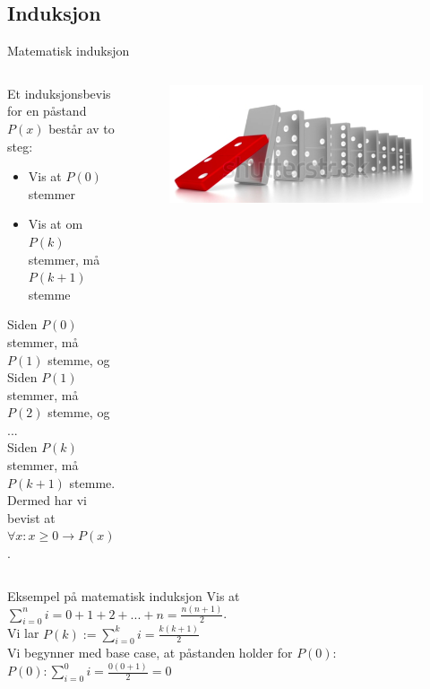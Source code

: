 \subsection{Induksjon}
\begin{frame}{Matematisk induksjon}
    \begin{columns}
        \begin{column}{0.65\textwidth}
            Et induksjonsbevis for en påstand $P(x)$ består av to steg:
            \begin{itemize}
                \item Vis at $P(0)$ stemmer
                \item Vis at om $P(k)$ stemmer, må $P(k+1)$ stemme
            \end{itemize}
        
            \pause
            Siden $P(0)$ stemmer, må $P(1)$ stemme, og\\
            Siden $P(1)$ stemmer, må $P(2)$ stemme, og\\
            ...\\
            Siden $P(k)$ stemmer, må $P(k+1)$ stemme.\\[1.5mm]
        
            \pause
            Dermed har vi bevist at $\forall x : x \geq 0 \rightarrow P(x)$.
        \end{column}
        \pause
        \begin{column}{0.2\textwidth}
            \begin{figure}
                \includegraphics[scale=0.1]{images/domino.PNG}
            \end{figure}
        \end{column}
    \end{columns}
\end{frame}

\begin{frame}{Eksempel på matematisk induksjon}
    Vis at $\sum_{i=0}^{n} i = 0 + 1 + 2 + ... + n = \frac{n(n+1)}{2}$.\\[4mm]
\pause    
    Vi lar $P(k) := \sum_{i=0}^{k} i = \frac{k(k+1)}{2}$\\[2mm]
\pause
    Vi begynner med base case, at påstanden holder for $P(0)$:\\
    $P(0): \sum_{i=0}^{0} i = \frac{0(0+1)}{2} = 0$ \checkmark\\
\end{frame}

